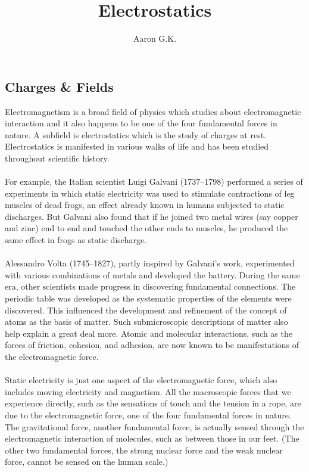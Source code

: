 \documentclass[9pt]{article}
\title{Electrostatics}
\author{Aaron G.K.}
\begin{document}
	\maketitle
	\begin{center}
		\section*{Charges \& Fields}	
	\end{center}
	Electromagnetism is a broad field of physics which studies about electromagnetic interaction and it also happens to be one of the four fundamental forces in nature. A subfield is electrostatics which is the study of charges at rest. Electrostatics is manifested in various walks of life and has been studied throughout scientific history. \\ \\ For example, the Italian scientist Luigi Galvani (1737–1798) performed a series of experiments in which static electricity was used to stimulate contractions of leg muscles of dead frogs, an effect already known in humans subjected to static discharges. But Galvani also found that if he joined two metal wires (say copper and zinc) end to end and touched the other ends to muscles, he produced the same effect in frogs as static discharge. \\ \\ Alessandro Volta (1745–1827), partly inspired by Galvani’s work, experimented with various combinations of metals and developed the battery. During the same era, other scientists made progress in discovering fundamental connections. The periodic table was developed as the systematic properties of the elements were discovered. This influenced the development and refinement of the concept of atoms as the basis of matter. Such submicroscopic descriptions of matter also help explain a great deal more. Atomic and molecular interactions, such as the forces of friction, cohesion, and adhesion, are now known to be manifestations of the electromagnetic force. \\ \\ Static electricity is just one aspect of the electromagnetic force, which also includes moving electricity and magnetism. 	All the macroscopic forces that we experience directly, such as the sensations of touch and the tension in a rope, are due to the electromagnetic force, one of the four fundamental forces in nature. The gravitational force, another fundamental force, is actually sensed through the electromagnetic interaction of molecules, such as between those in our feet. (The other two fundamental forces, the strong nuclear force and the weak nuclear force, cannot be sensed on the human scale.)\\
\end{document}

